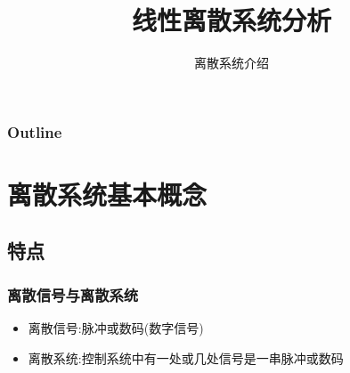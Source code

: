 \documentclass[table]{beamer}
\subtitle{离散系统介绍}
\title{线性离散系统分析}
\author{}
\date{}
\begin{document}
\maketitle

\begin{frame}
\frametitle{Outline}
\setcounter{tocdepth}{3}
\tableofcontents
\end{frame}













\section{离散系统基本概念}
\label{sec-1}
\subsection{特点}
\label{sec-1-1}
\begin{frame}
\frametitle{离散信号与离散系统}
\label{sec-1-1-1}

\begin{itemize}
\item <2->离散信号:脉冲或数码(数字信号)
\item <3->离散系统:控制系统中有一处或几处信号是一串脉冲或数码
\end{itemize}
\end{frame}
\end{document}
